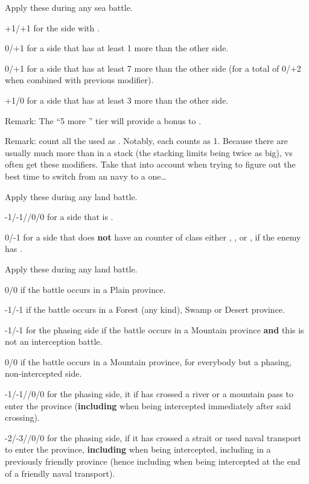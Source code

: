  Apply these during any sea battle.
\begin{modlist}
\item[+1/+1] for the side with .
\item[0/+1] for a side that has at least 1 more \ND than the other side.
\item[0/+1] for a side that has at least 7 more \ND than the other side
  (for a total of 0/+2 when combined with previous modifier).
\item[+1/0] for a side that has at least 3 more \ND than the other side.
\end{modlist}

Remark: The ``5 more \ND'' tier will provide a bonus to .

Remark: count all the \ND used as . Notably, each \NGD
counts as 1\ND. Because there are usually much more \NGD than \NWD in a stack
(the stacking limits being twice as big), \NGD vs \NWD often get these
modifiers. Take that into account when trying to figure out the best time to
switch from an \NGD navy to a \NWD one\ldots

 Apply these during any land battle.
\begin{modlist}
\item[-1/-1//0/0] for a side that is .
\item[0/-1] for a side that does \textbf{not} have an \ARMY counter of class
  either \CAI, \CAIM, \CAII or \CAIIM, if the enemy has \TTER.
\end{modlist}

 Apply these during any land battle.
\begin{modlist}
\item[0/0] if the battle occurs in a Plain province.
\item[-1/-1] if the battle occurs in a Forest (any kind), Swamp or
  Desert province.
\item[-1/-1] for the phasing side if the battle occurs in a Mountain
  province \textbf{and} this is not an interception battle.
\item[0/0] if the battle occurs in a Mountain province, for everybody but
  a phasing, non-intercepted side.
\item[-1/-1//0/0] for the phasing side, it if has crossed a river or a
  mountain pass to enter the province (\textbf{including} when being
  intercepted immediately after said crossing).
\item[-2/-3//0/0] for the phasing side, if it has crossed a strait or used
  naval transport to enter the province, \textbf{including} when being
  intercepted, including in a previously friendly province (hence including
  when being intercepted at the end of a friendly naval transport).
\end{modlist}

